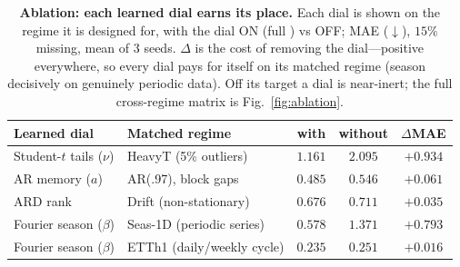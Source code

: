 \begin{table}[tbp]\centering\small
\setlength{\tabcolsep}{10pt}
\caption{\textbf{Ablation: each learned dial earns its place.} Each dial is shown on the regime it is designed for, with the dial ON (full \cafe{}) vs OFF; MAE ($\downarrow$), $15\%$ missing, mean of 3 seeds. $\Delta$ is the cost of removing the dial---positive everywhere, so every dial pays for itself on its matched regime (season decisively on genuinely periodic data). Off its target a dial is near-inert; the full cross-regime matrix is Fig.~\ref{fig:ablation}.}
\label{tab:ablation}
\begin{tabular}{@{}llccc@{}}
\toprule
Learned dial & Matched regime & with & without & $\Delta$MAE \\
\midrule
Student-$t$ tails ($\nu$) & HeavyT (5\% outliers) & $1.161$ & $2.095$ & $\mathbf{+0.934}$ \\
AR memory ($a$) & AR(.97), block gaps & $0.485$ & $0.546$ & $\mathbf{+0.061}$ \\
ARD rank & Drift (non-stationary) & $0.676$ & $0.711$ & $\mathbf{+0.035}$ \\
Fourier season ($\beta$) & Seas-1D (periodic series) & $0.578$ & $1.371$ & $\mathbf{+0.793}$ \\
Fourier season ($\beta$) & ETTh1 (daily/weekly cycle) & $0.235$ & $0.251$ & $\mathbf{+0.016}$ \\
\bottomrule
\end{tabular}
\end{table}
